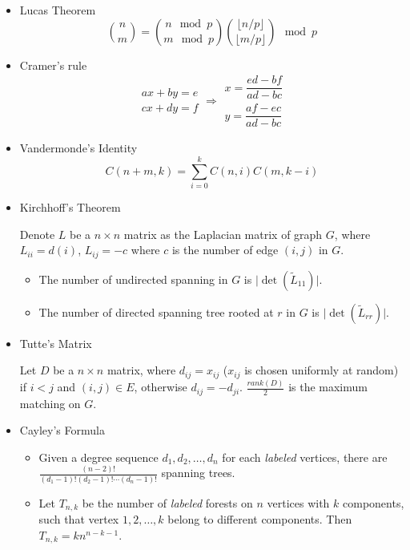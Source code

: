 \begin{itemize}
\item Lucas Theorem
$$
\binom{n}{m} = \binom{n \mod p}{m \mod p} \binom{\lfloor n / p \rfloor}{\lfloor m / p \rfloor} \mod p
$$

\item Cramer's rule
$$
\begin{aligned}ax+by=e\\cx+dy=f\end{aligned}
\Rightarrow
\begin{aligned}x=\dfrac{ed-bf}{ad-bc}\\y=\dfrac{af-ec}{ad-bc}\end{aligned}
$$

\item Vandermonde's Identity
$$
C(n + m, k) = \sum_{i=0}^k C(n, i)C(m, k - i)
$$

\item Kirchhoff's Theorem

Denote $L$ be a $n \times n$ matrix as the Laplacian matrix of graph $G$, where $L_{ii} = d(i)$, $L_{ij} = -c$ where $c$ is the number of edge $(i, j)$ in $G$.
\begin{itemize}
    \item The number of undirected spanning in $G$ is $\lvert \det(\tilde{L}_{11}) \rvert$.
    \item The number of directed spanning tree rooted at $r$ in $G$ is $\lvert \det(\tilde{L}_{rr}) \rvert$.
\end{itemize}

\item Tutte's Matrix

Let $D$ be a $n \times n$ matrix, where $d_{ij} = x_{ij}$ ($x_{ij}$ is chosen uniformly at random) if $i < j$ and $(i, j) \in E$, otherwise $d_{ij} = -d_{ji}$. $\frac{rank(D)}{2}$ is the maximum matching on $G$.

\item Cayley's Formula

\begin{itemize}
  \item Given a degree sequence $d_1, d_2, \ldots, d_n$ for each \textit{labeled} vertices, there are $\frac{(n - 2)!}{(d_1 - 1)!(d_2 - 1)!\cdots(d_n - 1)!}$ spanning trees.
  \item Let $T_{n, k}$ be the number of \textit{labeled} forests on $n$ vertices with $k$ components, such that vertex $1, 2, \ldots, k$ belong to different components. Then $T_{n, k} = kn^{n - k - 1}$.
\end{itemize}


\end{itemize}
